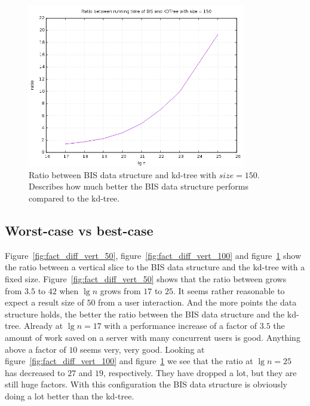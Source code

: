 \begin{figure}[h]
    \centering
    \includegraphics[width = 0.85\textwidth]{pictures/analysis/factor_difference_vert_150.png}
    \caption{Ratio between BIS data structure and kd-tree with $size=150$. Describes how much better the BIS data structure performs compared to the kd-tree.}\label{fig:fact_diff_vert_150}
\end{figure}
\clearpage

\subsection{Worst-case vs best-case}

Figure~\ref{fig:fact_diff_vert_50}, figure~\ref{fig:fact_diff_vert_100} and figure~\ref{fig:fact_diff_vert_150} show the ratio between a vertical slice to the BIS data structure and the kd-tree with a fixed size. Figure~\ref{fig:fact_diff_vert_50} shows that the ratio between grows from $3.5$ to $42$ when $\lg n$ grows from $17$ to $25$. It seems rather reasonable to expect a result size of $50$ from a user interaction. And the more points the data structure holds, the better the ratio between the BIS data structure and the kd-tree. Already at $\lg n = 17$ with a performance increase of a factor of $3.5$ the amount of work saved on a server with many concurrent users is good. Anything above a factor of $10$ seems very, very good. Looking at figure~\ref{fig:fact_diff_vert_100} and figure~\ref{fig:fact_diff_vert_150} we see that the ratio at $\lg n = 25$ has decreased to $27$ and $19$, respectively. They have dropped a lot, but they are still huge factors. With this configuration the BIS data structure is obviously doing a lot better than the kd-tree.




